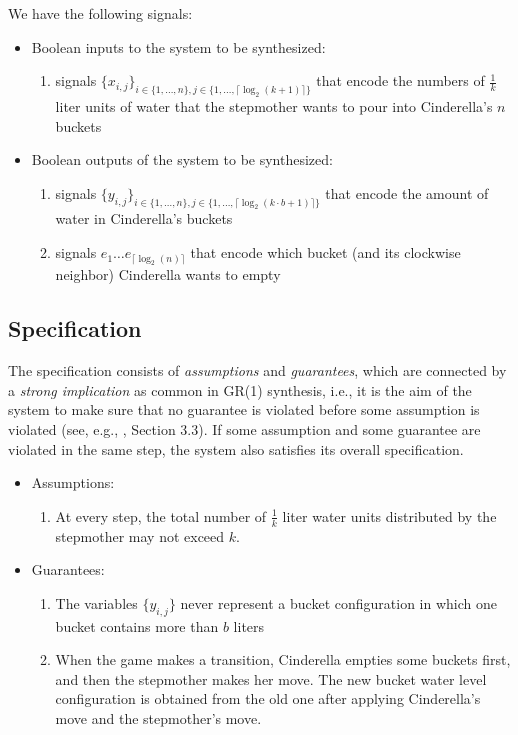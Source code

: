 \documentclass[a4paper,conference,10pt]{IEEEtran}
\begin{document}
\noindent We have the following signals:
\begin{itemize}
\item Boolean inputs to the system to be synthesized:
\begin{enumerate}
\item signals $\{\mathit{x}_{i,j}\}_{i \in \{1, \ldots, n\}, j \in \{1, \ldots, \lceil \log_2(k+1) \rceil \}}$ that encode the numbers of $\frac{1}{k}$ liter units of water that the stepmother wants to pour into Cinderella's $n$ buckets
\end{enumerate}
\item Boolean outputs of the system to be synthesized:
\begin{enumerate}
\item signals $\{\mathit{y}_{i,j}\}_{i \in \{1, \ldots, n\}, j \in \{1, \ldots, \lceil \log_2(k \cdot b+1) \rceil \}}$ that encode the amount of water in Cinderella's  buckets
\item signals $e_1 \ldots e_{\lceil \log_2(n)\rceil}$ that encode which bucket (and its clockwise neighbor) Cinderella wants to empty
\end{enumerate}
\end{itemize}

\subsection{Specification}
\noindent The specification consists of \emph{assumptions} and \emph{guarantees}, which are connected by a \emph{strong implication} as common in GR(1) synthesis, i.e., it is the aim of the system to make sure that no guarantee is violated before some assumption is violated (see, e.g., \cite{DBLP:journals/jcss/BloemJPPS12}, Section 3.3). If some assumption and some guarantee are violated in the same step, the system also satisfies its overall specification.
\begin{itemize}
\item Assumptions:
\begin{enumerate}
\item At every step, the total number of $\frac{1}{k}$ liter water units distributed by the stepmother may not exceed $k$.
\end{enumerate}
\item Guarantees:
\begin{enumerate}
\item The variables $\{\mathit{y}_{i,j}\}$ never represent a bucket configuration in which one bucket contains more than $b$ liters
\item When the game makes a transition, Cinderella empties some buckets first, and then the stepmother makes her move. The new bucket water level configuration is obtained from the old one after applying Cinderella's move and the stepmother's move.
\end{enumerate}
\end{itemize}
\end{document}
